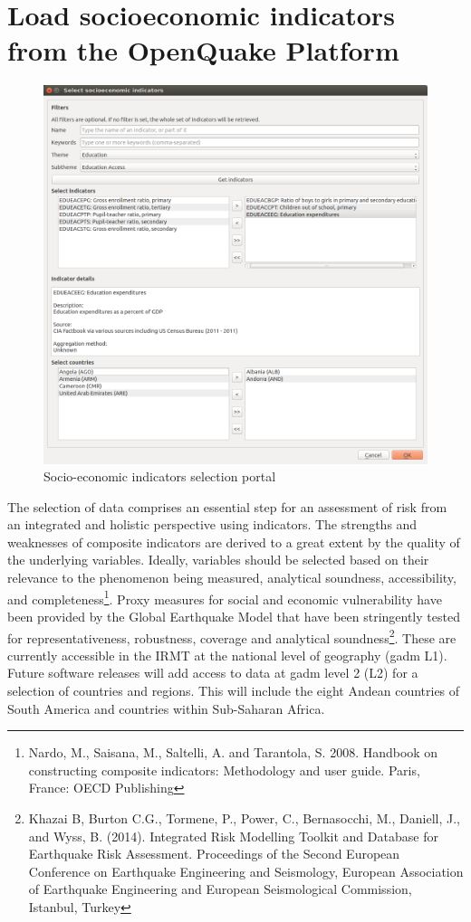 \chapter{Load socioeconomic indicators from the OpenQuake Platform}

\begin{figure}
    \centering
    \includegraphics[width=\textwidth]{../images/image23}
    \caption{Socio-economic indicators selection portal}
    \label{fig:load_indicators_from_platform}
\end{figure}

The selection of data comprises an essential step for an assessment of risk
from an integrated and holistic perspective using indicators. The strengths and
weaknesses of composite indicators are derived to a great extent by the quality
of the underlying variables. Ideally, variables should be selected based on
their relevance to the phenomenon being measured, analytical soundness,
accessibility, and completeness\footnote{Nardo, M., Saisana, M., Saltelli, A.
and Tarantola, S. 2008. Handbook on constructing composite indicators:
Methodology and user guide. Paris, France: OECD Publishing}. Proxy measures for
social and economic vulnerability have been provided by the Global Earthquake
Model that have been stringently tested for representativeness, robustness,
coverage and analytical soundness\footnote{Khazai B, Burton C.G., Tormene, P.,
Power, C., Bernasocchi, M., Daniell, J., and Wyss, B. (2014). Integrated Risk
Modelling Toolkit and Database for Earthquake Risk Assessment. Proceedings of
the Second European Conference on Earthquake Engineering and Seismology,
European Association of Earthquake Engineering and European Seismological
Commission, Istanbul, Turkey}. These are currently accessible in the IRMT at
the national level of geography (gadm L1). Future software releases will add
access to data at gadm level 2 (L2) for a selection of countries and regions.
This will include the eight Andean countries of South America and countries
within Sub-Saharan Africa.


